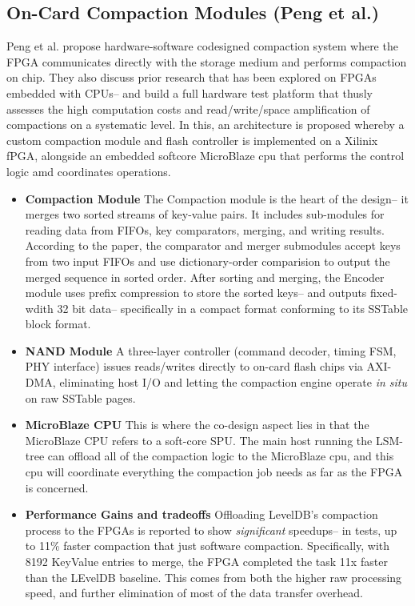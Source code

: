 \documentclass[sigconf]{acmart}
\begin{document}
  \subsection{On-Card Compaction Modules (Peng et al.)}
  Peng et al. propose hardware-software codesigned compaction system where the FPGA communicates directly with the storage medium and performs compaction on chip. They also discuss prior research that has been explored on FPGAs embedded with CPUs-- and build a full hardware test platform that thusly assesses the high computation costs and read/write/space amplification of compactions on a systematic level.
  In this, an architecture is proposed whereby a custom compaction module and flash controller is implemented on a Xilinix fPGA, alongside an embedded softcore MicroBlaze cpu that performs the control logic amd coordinates operations.

    \begin{itemize}
      \item \textbf{Compaction Module}
        The Compaction module is the heart of the design-- it merges two sorted streams of key-value pairs. It includes sub-modules for reading data from FIFOs, key comparators, merging, and writing results. According to the paper, the 
        comparator and merger submodules accept keys from two input FIFOs and use dictionary-order comparision to output the merged sequence in sorted order. After sorting and merging, the Encoder module uses prefix compression to store the sorted keys-- and outputs fixed-wdith 
        32 bit data-- specifically in a compact format conforming to its SSTable block format. 
      \item \textbf{NAND Module}
        A three-layer controller (command decoder, timing FSM, PHY interface) issues reads/writes directly to on-card flash chips via AXI-DMA, eliminating host I/O and letting the compaction engine operate \emph{in situ} on raw SSTable pages.
      \item \textbf{MicroBlaze CPU}
        This is where the co-design aspect lies in that the MicroBlaze CPU refers to a soft-core SPU. The main host running the LSM-tree can offload all of the compaction logic to the MicroBlaze cpu, and this cpu will coordinate everything the compaction job needs as far as the FPGA is concerned.
      \item \textbf{Performance Gains and tradeoffs}
        Offloading LevelDB's compaction process to the FPGAs is reported to show \emph{significant} speedups-- in tests, up to 11\% faster compaction that just software compaction. Specifically, with 8192 KeyValue entries to merge, the FPGA completed the task 11x faster than the LEvelDB baseline. 
        This comes from both the higher raw processing speed, and further elimination of most of the data transfer overhead. 
    \end{itemize}
\end{document}
